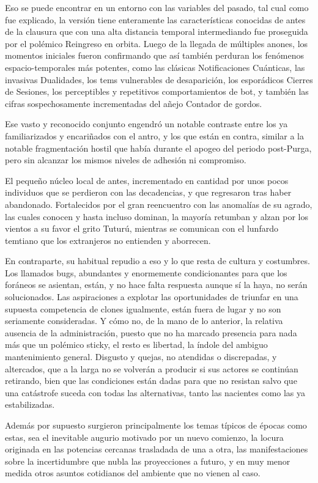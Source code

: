 \documentclass[
  spanish,
]{book}
\begin{document}
Eso se puede encontrar en un entorno con las variables del pasado, tal cual como fue explicado, la versión tiene enteramente las características conocidas de antes de la clausura que con una alta distancia temporal intermediando fue proseguida por el polémico Reingreso en orbita. Luego de la llegada de múltiples anones, los momentos iniciales fueron confirmando que así también perduran los fenómenos espacio-temporales más potentes, como las clásicas Notificaciones Cuánticas, las invasivas Dualidades, los tems vulnerables de desaparición, los esporádicos Cierres de Sesiones, los perceptibles y repetitivos comportamientos de bot, y también las cifras sospechosamente incrementadas del añejo Contador de gordos.

Ese vasto y reconocido conjunto engendró un notable contraste entre los ya familiarizados y encariñados con el antro, y los que están en contra, similar a la notable fragmentación hostil que había durante el apogeo del periodo post-Purga, pero sin alcanzar los mismos niveles de adhesión ni compromiso.

El pequeño núcleo local de antes, incrementado en cantidad por unos pocos individuos que se perdieron con las decadencias, y que regresaron tras haber abandonado. Fortalecidos por el gran reencuentro con las anomalías de su agrado, las cuales conocen y hasta incluso dominan, la mayoría retumban y alzan por los vientos a su favor el grito Tuturú, mientras se comunican con el lunfardo temtiano que los extranjeros no entienden y aborrecen.

En contraparte, su habitual repudio a eso y lo que resta de cultura y costumbres. Los llamados bugs, abundantes y enormemente condicionantes para que los foráneos se asientan, están, y no hace falta respuesta aunque sí la haya, no serán solucionados. Las aspiraciones a explotar las oportunidades de triunfar en una supuesta competencia de clones igualmente, están fuera de lugar y no son seriamente consideradas. Y cómo no, de la mano de lo anterior, la relativa ausencia de la administración, puesto que no ha marcado presencia para nada más que un polémico sticky, el resto es libertad, la índole del ambiguo mantenimiento general. Disgusto y quejas, no atendidas o discrepadas, y altercados, que a la larga no se volverán a producir si sus actores se continúan retirando, bien que las condiciones están dadas para que no resistan salvo que una catástrofe suceda con todas las alternativas, tanto las nacientes como las ya estabilizadas.

Además por supuesto surgieron principalmente los temas típicos de épocas como estas, sea el inevitable augurio motivado por un nuevo comienzo, la locura originada en las potencias cercanas trasladada de una a otra, las manifestaciones sobre la incertidumbre que nubla las proyecciones a futuro, y en muy menor medida otros asuntos cotidianos del ambiente que no vienen al caso.
\end{document}
